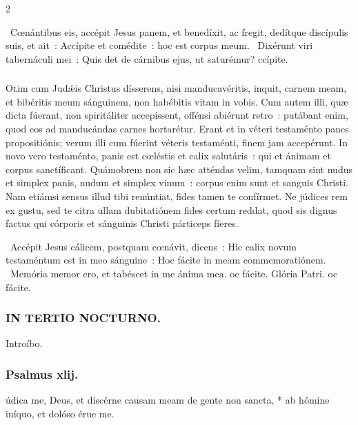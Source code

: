 \documentclass[9pt,twoside]{extarticle}
\begin{document}
\begin{multicols}{2}
{{\begin{tightlist}{}
\item {}~Cœnántibus eis, accépit Jesus panem, et benedíxit, ac fregit, dedítque discípulis suis, et ait~: \textred{*} Accípite et comédite~: hoc est corpus meum. ~Dixérunt viri tabernáculi mei~: Quis det de cárnibus ejus, ut saturémur? ccípite.
\end{tightlist}

\subsubsection*{\center {}}
\lettrine{O}lim cum Judǽis Christus dísserens, nisi manducavéritis, inquit, carnem meam, et bibéritis meum sánguinem, non habébitis vitam in vobis. Cum autem illi, quæ dicta fúerant, non spiritáliter accepíssent, offénsi abiérunt retro~: putábant enim, quod eos ad manducándas carnes hortarétur. Erant et in véteri testaménto panes propositiónis; verum illi cum fúerint véteris testaménti, finem jam accepérunt. In novo vero testaménto, panis est cœléstis et calix salutáris~: qui et ánimam et corpus sanctíficant. Quámobrem non sic hæc atténdas velim, tamquam sint nudus et simplex panis, nudum et simplex vinum~: corpus enim sunt et sanguis Christi. Nam etiámsi sensus illud tibi renúntiat, fides tamen te confírmet. Ne júdices rem ex gustu, sed te citra ullam dubitatiónem fides certum reddat, quod sis dignus factus qui córporis et sánguinis Christi párticeps fíeres.

\begin{tightlist}{}
\item {}~Accépit Jesus cálicem, postquam cœnávit, dicens~: Hic calix novum testaméntum est in meo sánguine~: \textred{*} Hoc fácite in meam commemoratiónem. ~Memória memor ero, et tabéscet in me ánima mea. oc fácite. Glória Patri. oc fácite.
\end{tightlist}

\subsubsection*{\center \textsc{IN TERTIO NOCTURNO.}}
\begin{tightlist}{}
\item {} Introíbo.
\end{tightlist}
\subsubsection*{\center Psalmus xlij.}
údica me, Deus, et discérne causam meam de gente non sancta, * ab hómine iníquo, et dolóso érue me.

}}
\end{multicols}
\end{document}
